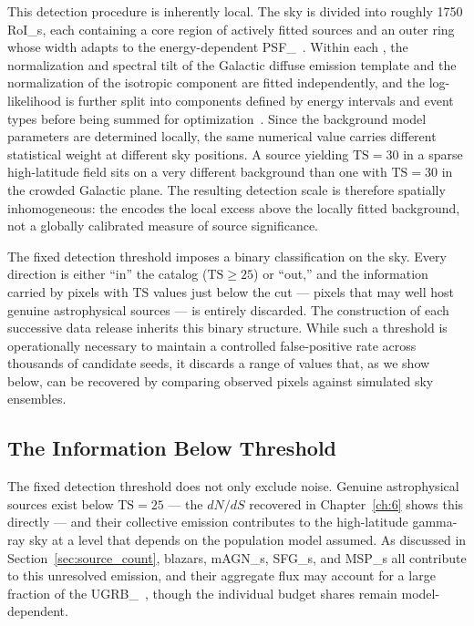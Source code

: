 This detection procedure is inherently local.
The sky is divided into roughly 1750 \glspl{RoI_}, each containing a core region of actively fitted sources and an outer ring whose width adapts to the energy-dependent \gls{PSF_}~\cite{Fermi-LAT:2019yla}. Within each \RoI, the normalization and spectral tilt of the Galactic diffuse emission template and the normalization of the isotropic component are fitted independently, and the log-likelihood is further split into components defined by energy intervals and event types before being summed for optimization~\cite{Fermi-LAT:2019yla}.
Since the background model parameters are determined locally, the same numerical \TS value carries different statistical weight at different sky positions.
A source yielding $\mathrm{TS} = 30$ in a sparse high-latitude field sits on a very different background than one with $\mathrm{TS} = 30$ in the crowded Galactic plane.
The resulting detection scale is therefore spatially inhomogeneous: the \TS encodes the local excess above the locally fitted background, not a globally calibrated measure of source significance.

The fixed detection threshold imposes a binary classification on the sky.
Every direction is either ``in'' the catalog ($\mathrm{TS} \geq 25$) or ``out,'' and the information carried by pixels with $\mathrm{TS}$ values just below the cut --- pixels that may well host genuine astrophysical sources --- is entirely discarded.
The construction of each successive data release inherits this binary structure.
While such a threshold is operationally necessary to maintain a controlled false-positive rate across thousands of candidate seeds, it discards a range of \TS values that, as we show below, can be recovered by comparing observed pixels against simulated sky ensembles.

\subsection{The Information Below Threshold}
\label{sec:info_below_threshold}

The fixed detection threshold does not only exclude noise.
Genuine astrophysical sources exist below $\mathrm{TS} = 25$ --- the $dN/dS$ recovered in Chapter~\ref{ch:6} shows this directly --- and their collective emission contributes to the high-latitude gamma-ray sky at a level that depends on the population model assumed.
As discussed in Section~\ref{sec:source_count}, blazars, \glspl{mAGN_}, \glspl{SFG_}, and \glspl{MSP_} all contribute to this unresolved emission, and their aggregate flux may account for a large fraction of the \gls{UGRB_}~\cite{DGRB-review,Fermi-LAT:2014ryh}, though the individual budget shares remain model-dependent.

